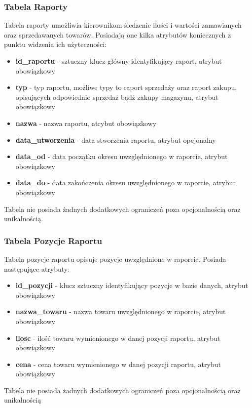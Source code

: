 \subsubsection{Tabela Raporty}
Tabela raporty umożliwia kierownikom śledzenie ilości i wartości zamawianych
oraz sprzedawanych towarów. Posiadają one kilka atrybutów koniecznych z punktu
widzenia ich użyteczności:
\begin{itemize}
  \item \textbf{id\_raportu} - sztuczny klucz główny identyfikujący raport,
  atrybut obowiązkowy
  \item \textbf{typ} - typ raportu, możliwe typy to raport sprzedaży oraz raport
  zakupu, opisujących odpowiednio sprzedaż bądź zakupy magazynu, atrybut
  obowiązkowy
  \item \textbf{nazwa} - nazwa raportu, atrybut obowiązkowy
  \item \textbf{data\_utworzenia} - data stworzenia raportu, atrybut opcjonalny
  \item \textbf{data\_od} - data początku okresu uwzględnionego w raporcie,
  atrybut obowiązkowy
  \item \textbf{data\_do} - data zakończenia okresu uwzględnionego w raporcie,
  atrybut obowiązkowy
\end{itemize}

Tabela nie posiada żadnych dodatkowych ograniczeń poza opcjonalnością oraz
unikalnością.

\subsubsection{Tabela Pozycje Raportu}
Tabela pozycje raportu opisuje pozycje uwzględnione w raporcie. Posiada
następujące atrybuty:
\begin{itemize}
  \item \textbf{id\_pozycji} - klucz sztuczny identyfikujący pozycje w bazie
  danych, atrybut obowiązkowy
  \item \textbf{nazwa\_towaru} - nazwa towaru uwzględnionego w raporcie, atrybut
  obowiązkowy
  \item \textbf{ilosc} - ilość towaru wymienionego w danej pozycji raportu,
  atrybut obowiązkowy
  \item \textbf{cena} - cena towaru wymienionego w danej pozycji raportu,
  atrybut obowiązkowy
\end{itemize}

Tabela nie posiada żadnych dodatkowych ograniczeń poza opcjonalnością oraz
unikalnością
